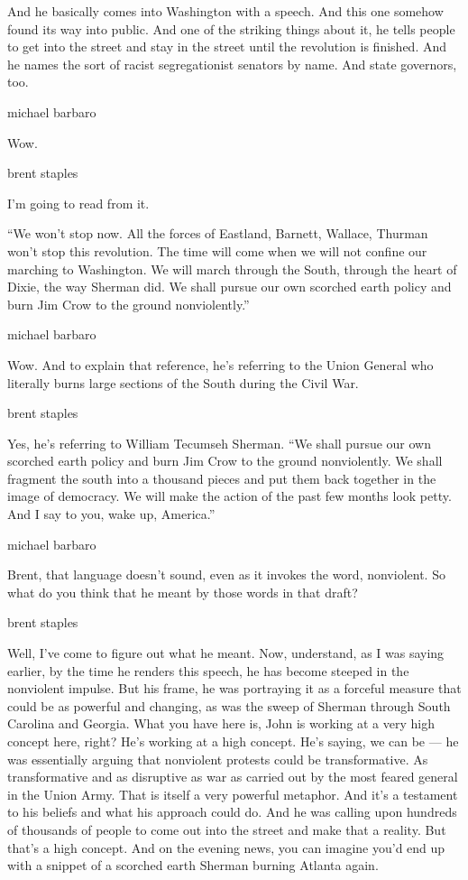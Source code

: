 And he basically comes into Washington with a speech. And this one
somehow found its way into public. And one of the striking things about
it, he tells people to get into the street and stay in the street until
the revolution is finished. And he names the sort of racist
segregationist senators by name. And state governors, too.

michael barbaro

Wow.

brent staples

I'm going to read from it.

``We won't stop now. All the forces of Eastland, Barnett, Wallace,
Thurman won't stop this revolution. The time will come when we will not
confine our marching to Washington. We will march through the South,
through the heart of Dixie, the way Sherman did. We shall pursue our own
scorched earth policy and burn Jim Crow to the ground nonviolently.''

michael barbaro

Wow. And to explain that reference, he's referring to the Union General
who literally burns large sections of the South during the Civil War.

brent staples

Yes, he's referring to William Tecumseh Sherman. ``We shall pursue our
own scorched earth policy and burn Jim Crow to the ground nonviolently.
We shall fragment the south into a thousand pieces and put them back
together in the image of democracy. We will make the action of the past
few months look petty. And I say to you, wake up, America.''

michael barbaro

Brent, that language doesn't sound, even as it invokes the word,
nonviolent. So what do you think that he meant by those words in that
draft?

brent staples

Well, I've come to figure out what he meant. Now, understand, as I was
saying earlier, by the time he renders this speech, he has become
steeped in the nonviolent impulse. But his frame, he was portraying it
as a forceful measure that could be as powerful and changing, as was the
sweep of Sherman through South Carolina and Georgia. What you have here
is, John is working at a very high concept here, right? He's working at
a high concept. He's saying, we can be --- he was essentially arguing
that nonviolent protests could be transformative. As transformative and
as disruptive as war as carried out by the most feared general in the
Union Army. That is itself a very powerful metaphor. And it's a
testament to his beliefs and what his approach could do. And he was
calling upon hundreds of thousands of people to come out into the street
and make that a reality. But that's a high concept. And on the evening
news, you can imagine you'd end up with a snippet of a scorched earth
Sherman burning Atlanta again.

